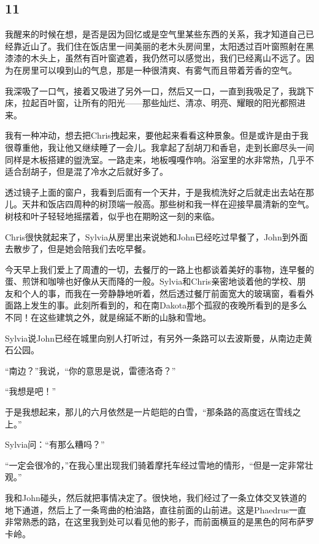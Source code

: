 \documentclass[UTF8]{article}
\begin{document}
\subsection*{11}
\par 我醒来的时候在想，是否是因为回忆或是空气里某些东西的关系，我才知道自己已经靠近山了。我们住在饭店里一间美丽的老木头房间里，太阳透过百叶窗照射在黑漆漆的木头上，虽然有百叶窗遮着，我仍然可以感觉出，我们已经离山不远了。因为在房里可以嗅到山的气息，那是一种很清爽、有雾气而且带着芳香的空气。
\par 我深吸了一口气，接着又吸进了另外一口，然后又一口，一直到我吸足了，我跳下床，拉起百叶窗，让所有的阳光——那些灿烂、清凉、明亮、耀眼的阳光都照进来。
\par 我有一种冲动，想去把Chris拽起来，要他起来看看这种景象。但是或许是由于我很尊重他，我让他又继续睡了一会儿。我拿起了刮胡刀和香皂，走到长廊尽头一间同样是木板搭建的盥洗室。一路走来，地板嘎嘎作响。浴室里的水非常热，几乎不适合刮胡子，但是混了冷水之后就好多了。
\par 透过镜子上面的窗户，我看到后面有一个天井，于是我梳洗好之后就走出去站在那儿。天井和饭店四周种的树顶端一般高。那些树和我一样在迎接早晨清新的空气。树枝和叶子轻轻地摇摆着，似乎也在期盼这一刻的来临。
\par Chris很快就起来了，Sylvia从房里出来说她和John已经吃过早餐了，John到外面去散步了，但是她会陪我们去吃早餐。
\par 今天早上我们爱上了周遭的一切，去餐厅的一路上也都谈着美好的事物，连早餐的蛋、煎饼和咖啡也好像从天而降的一般。Sylvia和Chris亲密地谈着他的学校、朋友和个人的事，而我在一旁静静地听着，然后透过餐厅前面宽大的玻璃窗，看看外面路上发生的事。此刻所看到的，和在南Dakota那个孤寂的夜晚所看到的是多么不同！在这些建筑之外，就是绵延不断的山脉和雪地。
\par Sylvia说John已经在城里向别人打听过，有另外一条路可以去波斯曼，从南边走黄石公园。
\par “南边？”我说，“你的意思是说，雷德洛奇？”
\par “我想是吧！”
\par 于是我想起来，那儿的六月依然是一片皑皑的白雪，“那条路的高度远在雪线之上。”
\par Sylvia问：“有那么糟吗？”
\par “一定会很冷的，”在我心里出现我们骑着摩托车经过雪地的情形，“但是一定非常壮观。”
\par 我和John碰头，然后就把事情决定了。很快地，我们经过了一条立体交叉铁道的地下通道，然后上了一条弯曲的柏油路，直往前面的山前进。这是Phaedrus一直非常熟悉的路，在这里我到处可以看见他的影子，而前面横亘的是黑色的阿布萨罗卡岭。
\end{document}
